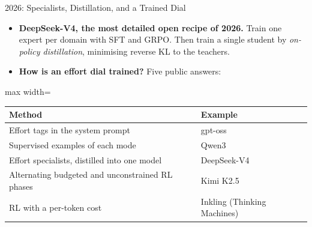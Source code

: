 \begin{frame}{2026: Specialists, Distillation, and a Trained Dial}
    \begin{itemize}\itemsep0.35em
        \item \textbf{DeepSeek-V4, the most detailed open recipe of 2026.} Train one expert per domain with SFT and GRPO. Then train a single student by \emph{on-policy distillation}, minimising reverse KL to the teachers.
        \item \textbf{How is an effort dial trained?} Five public answers:
    \end{itemize}
    \begin{center}
    \small
    \renewcommand{\arraystretch}{1.08}
    \begin{adjustbox}{max width=\linewidth}\begin{tabular}{>{\raggedright\arraybackslash}p{6.2cm}>{\raggedright\arraybackslash}p{6.6cm}}
        \toprule
        \textbf{Method} & \textbf{Example} \\
        \midrule
        Effort tags in the system prompt & gpt-oss \\
        Supervised examples of each mode & Qwen3 \\
        Effort specialists, distilled into one model & DeepSeek-V4 \\
        Alternating budgeted and unconstrained RL phases & Kimi K2.5 \\
        RL with a per-token cost & Inkling (Thinking Machines) \\
        \bottomrule
    \end{tabular}\end{adjustbox}
    \end{center}
\end{frame}

